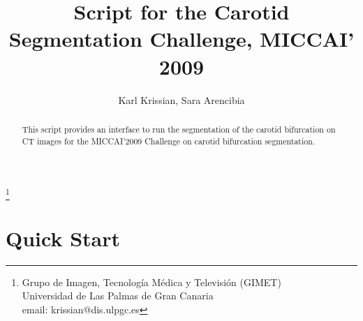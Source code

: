 \documentclass{article}
\begin{document}
\title{Script for the Carotid Segmentation Challenge, MICCAI' 2009}
\author{Karl Krissian, Sara Arencibia}
\thanks{
Grupo de Imagen, Tecnolog\'ia M\'edica y Televisi\'on (GIMET)\\
Universidad de Las Palmas de Gran Canaria\\
email: krissian@dis.ulpgc.es
}


\maketitle

\begin{abstract}
This script provides an interface to run the segmentation of 
the carotid bifurcation on CT images for the MICCAI'2009 Challenge on carotid bifurcation segmentation.
\end{abstract}


\section{Quick Start}
\end{document}
